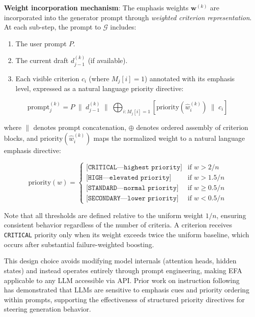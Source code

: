\documentclass[11pt]{article}
\newcommand{\efa}{\textsc{EFA}}  %
\newcommand{\calG}{\mathcal{G}}
\begin{document}
\textbf{Weight incorporation mechanism}: The emphasis weights $\mathbf{w}^{(k)}$ are incorporated into the generator prompt through \emph{weighted criterion representation}. At each sub-step, the prompt to $\calG$ includes:
\begin{enumerate}[leftmargin=*]
    \item The user prompt $P$.
    \item The current draft $d_{j-1}^{(k)}$ (if available).
    \item Each visible criterion $c_i$ (where $M_j[i] = 1$) annotated with its emphasis level, expressed as a natural language priority directive:
\end{enumerate}

\begin{equation}
    \text{prompt}_j^{(k)} = P \;\|\; d_{j-1}^{(k)} \;\|\; \bigoplus_{i : M_j[i]=1} \left[ \text{priority}(\hat{w}_i^{(k)}) \;\|\; c_i \right]
\label{eq:prompt_construction}
\end{equation}

where $\|$ denotes prompt concatenation, $\oplus$ denotes ordered assembly of criterion blocks, and $\text{priority}(\hat{w}_i^{(k)})$ maps the normalized weight to a natural language emphasis directive:

\begin{equation}
    \text{priority}(w) = \begin{cases}
    \texttt{[CRITICAL---highest priority]} & \text{if } w > 2/n \\
    \texttt{[HIGH---elevated priority]} & \text{if } w > 1.5/n \\
    \texttt{[STANDARD---normal priority]} & \text{if } w \geq 0.5/n \\
    \texttt{[SECONDARY---lower priority]} & \text{if } w < 0.5/n
    \end{cases}
\label{eq:priority}
\end{equation}

Note that all thresholds are defined relative to the uniform weight $1/n$, ensuring consistent behavior regardless of the number of criteria. A criterion receives \texttt{CRITICAL} priority only when its weight exceeds twice the uniform baseline, which occurs after substantial failure-weighted boosting.

This design choice avoids modifying model internals (attention heads, hidden states) and instead operates entirely through prompt engineering, making \efa{} applicable to any LLM accessible via API. Prior work on instruction following \citep{wei2022finetuned} has demonstrated that LLMs are sensitive to emphasis cues and priority ordering within prompts, supporting the effectiveness of structured priority directives for steering generation behavior.
\end{document}
